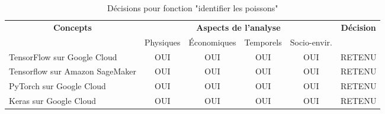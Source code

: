 


\begin{table}[!htbp]
	\begin{tabular}{|l|c|c|c|c|c|}
		\hline
		\multicolumn{1}{|c|}{\multirow{2}{*}{\textbf{Concepts}}} & \multicolumn{4}{c|}{\textbf{Aspects de l'analyse}} & \multirow{2}{*}{\textbf{Décision}} \\ \cline{2-5}
		\multicolumn{1}{|c|}{}                                   & Physiques & Économiques & Temporels & Socio-envir. &                                    \\ \hline
		TensorFlow sur Google Cloud                                                 & OUI       & OUI         & OUI       & OUI          & RETENU                             \\ \hline
		Tensorflow sur Amazon SageMaker                                                 & OUI       & OUI         & OUI       & OUI          & RETENU                             \\ \hline
		PyTorch sur Google Cloud                                                 & OUI       & OUI         & OUI       & OUI          & RETENU                             \\ \hline
		Keras sur Google Cloud                                                 & OUI       & OUI         & OUI       & OUI          & RETENU	        \\ \hline
	\end{tabular}
	\caption{Décisions pour fonction "identifier les poissons"}
	\label{tab:fct_identifier}
\end{table}